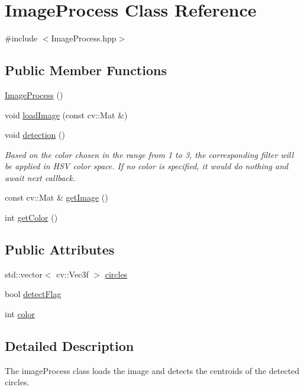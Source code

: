 \hypertarget{classImageProcess}{}\section{Image\+Process Class Reference}
\label{classImageProcess}


{\ttfamily \#include $<$Image\+Process.\+hpp$>$}

\subsection*{Public Member Functions}
\begin{DoxyCompactItemize}
\item 
\hyperlink{classImageProcess_a3dd8d2b73be1d21ccac33921defcf533}{Image\+Process} ()
\item 
void \hyperlink{classImageProcess_a4c08cfba39236fa09ec5f2d0e37452fb}{load\+Image} (const cv\+::\+Mat \&)
\item 
void \hyperlink{classImageProcess_a0a4d4d847095fa9632565ec68b746b4f}{detection} ()
\begin{DoxyCompactList}\small\item\em Based on the color chosen in the range from 1 to 3, the corresponding filter will be applied in H\+SV color space. If no color is specified, it would do nothing and await next callback. \end{DoxyCompactList}\item 
const cv\+::\+Mat \& \hyperlink{classImageProcess_abedcfaaa343e334b5bc09a45e69c92ba}{get\+Image} ()
\item 
int \hyperlink{classImageProcess_a98f98b789934e466c504977d3af3f031}{get\+Color} ()
\end{DoxyCompactItemize}
\subsection*{Public Attributes}
\begin{DoxyCompactItemize}
\item 
std\+::vector$<$ cv\+::\+Vec3f $>$ \hyperlink{classImageProcess_aafcbd180aa8e8dd937f736a43685a6bc}{circles}
\item 
bool \hyperlink{classImageProcess_a265b78fb51ab67a89743dd9c3f85e69b}{detect\+Flag}
\item 
int \hyperlink{classImageProcess_ab96f8c1ee03f6bbf8e60ffa496fdaa0d}{color}
\end{DoxyCompactItemize}


\subsection{Detailed Description}
The image\+Process class loads the image and detects the centroids of the detected circles. 

